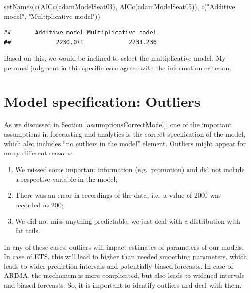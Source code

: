 \documentclass[
]{book}
\newenvironment{Shaded}{\begin{snugshade}}{\end{snugshade}}
\newcommand{\FunctionTok}[1]{\textcolor[rgb]{0.00,0.00,0.00}{#1}}
\newcommand{\NormalTok}[1]{#1}
\newcommand{\StringTok}[1]{\textcolor[rgb]{0.31,0.60,0.02}{#1}}
\providecommand{\tightlist}{%
  \setlength{\itemsep}{0pt}\setlength{\parskip}{0pt}}
\theoremstyle{definition}
\theoremstyle{definition}
\theoremstyle{definition}
\theoremstyle{definition}
\theoremstyle{remark}
\begin{document}
\begin{Shaded}
\begin{Highlighting}[]
\FunctionTok{setNames}\NormalTok{(}\FunctionTok{c}\NormalTok{(}\FunctionTok{AICc}\NormalTok{(adamModelSeat03), }\FunctionTok{AICc}\NormalTok{(adamModelSeat05)),}
         \FunctionTok{c}\NormalTok{(}\StringTok{"Additive model"}\NormalTok{, }\StringTok{"Multiplicative model"}\NormalTok{))}
\end{Highlighting}
\end{Shaded}

\begin{verbatim}
##       Additive model Multiplicative model 
##             2230.071             2233.236
\end{verbatim}

Based on this, we would be inclined to select the multiplicative model. My personal judgment in this specific case agrees with the information criterion.

\hypertarget{diagnosticsOutliers}{%
\section{Model specification: Outliers}\label{diagnosticsOutliers}}

As we discussed in Section \ref{assumptionsCorrectModel}, one of the important assumptions in forecasting and analytics is the correct specification of the model, which also includes ``no outliers in the model'' element. Outliers might appear for many different reasons:

\begin{enumerate}
\def\labelenumi{\arabic{enumi}.}
\tightlist
\item
  We missed some important information (e.g.~promotion) and did not include a respective variable in the model;
\item
  There was an error in recordings of the data, i.e.~a value of 2000 was recorded as 200;
\item
  We did not miss anything predictable, we just deal with a distribution with fat tails.
\end{enumerate}

In any of these cases, outliers will impact estimates of parameters of our models. In case of ETS, this will lead to higher than needed smoothing parameters, which leads to wider prediction intervals and potentially biased forecasts. In case of ARIMA, the mechanism is more complicated, but also leads to widened intervals and biased forecasts. So, it is important to identify outliers and deal with them.
\end{document}
